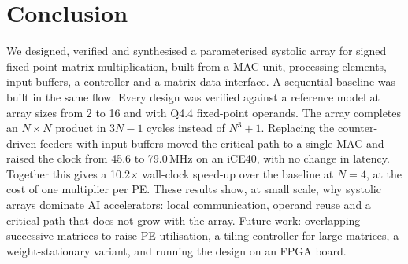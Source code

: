 \documentclass[conference]{IEEEtran}
\begin{document}
\section{Conclusion}
We designed, verified and synthesised a parameterised systolic array for signed
fixed-point matrix multiplication, built from a MAC unit, processing elements,
input buffers, a controller and a matrix data interface. A sequential baseline
was built in the same flow. Every design was verified against a reference
model at array sizes from 2 to 16 and with Q4.4 fixed-point operands. The array
completes an $N \times N$ product in $3N - 1$ cycles instead of $N^3 + 1$.
Replacing the counter-driven feeders with input buffers moved the critical path
to a single MAC and raised the clock from 45.6 to 79.0\,MHz on an iCE40, with
no change in latency. Together this gives a 10.2$\times$ wall-clock speed-up over
the baseline at $N = 4$, at the cost of one multiplier per PE. These results
show, at small scale, why systolic arrays dominate AI accelerators: local
communication, operand reuse and a critical path that does not grow with the
array. Future work: overlapping successive matrices to raise PE utilisation, a
tiling controller for large matrices, a weight-stationary variant, and running
the design on an FPGA board.
\end{document}
